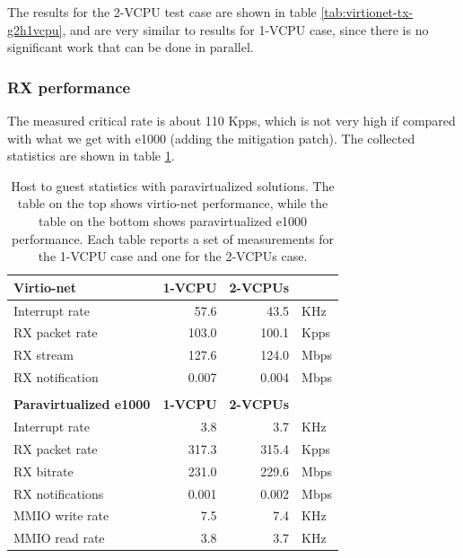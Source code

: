 The results for the 2-VCPU test case are shown in table \ref{tab:virtionet-tx-g2h1vcpu}, and are very similar to results for 1-VCPU case,
since there is no significant work that can be done in parallel.


\subsubsection{RX performance}
\label{sec:virtionet-perf-rx}
The measured critical rate is about 110 Kpps, which is not very high if compared with what we get with e1000 (adding the mitigation patch).
The collected statistics are shown in table \ref{tab:virtionet-rx-g2h1vcpu}.

\begin{table}
\begin{center}
\begin{tabular}{lrrl}
\toprule
\textbf{Virtio-net} & \textbf{1-VCPU} & \textbf{2-VCPUs} & \\
\midrule
Interrupt rate & 57.6 & 43.5 & KHz\\
RX packet rate & 103.0 & 100.1 & Kpps\\
RX stream & 127.6 & 124.0 & Mbps\\
RX notification & 0.007 & 0.004 & Mbps\\
\bottomrule
\\
\toprule
\textbf{Paravirtualized e1000} & \textbf{1-VCPU} & \textbf{2-VCPUs} & \\
\midrule
Interrupt rate & 3.8 & 3.7 & KHz\\
RX packet rate & 317.3 & 315.4 & Kpps\\
RX bitrate & 231.0 & 229.6 & Mbps\\
RX notifications & 0.001 & 0.002 & Mbps\\
MMIO write rate & 7.5 & 7.4 & KHz\\
MMIO read rate & 3.8 & 3.7 & KHz\\
\bottomrule
\end{tabular}
\end{center}
\caption{Host to guest statistics with paravirtualized solutions. The table on the top shows virtio-net performance, while the table on
	 the bottom shows paravirtualized e1000 performance. Each table reports a set of measurements for the 1-VCPU case and one for
	 the 2-VCPUs case.}
\label{tab:virtionet-rx-g2h1vcpu}
\end{table}

